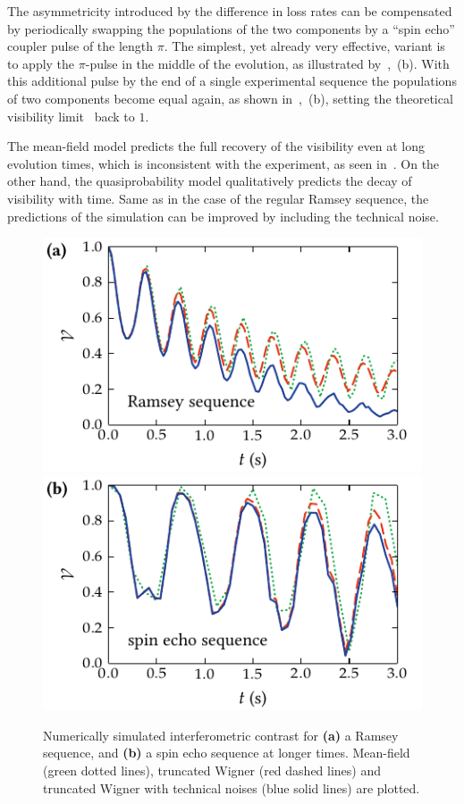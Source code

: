 The asymmetricity introduced by the difference in loss rates can be compensated by periodically swapping the populations of the two components by a ``spin echo'' coupler pulse of the length $\pi$.
The simplest, yet already very effective, variant is to apply the $\pi$-pulse in the middle of the evolution, as illustrated by~,~(b).
With this additional pulse by the end of a single experimental sequence the populations of two components become equal again, as shown in~,~(b), setting the theoretical visibility limit~ back to $1$.

The mean-field model predicts the full recovery of the visibility even at long evolution times, which is inconsistent with the experiment, as seen in~.
On the other hand, the quasiprobability model qualitatively predicts the decay of visibility with time.
Same as in the case of the regular Ramsey sequence, the predictions of the simulation can be improved by including the technical noise.

\begin{figure}
    \centerline{%
    \includegraphics{figures_generated/bec_noise/ramsey_visibility_long.pdf}%
    \includegraphics{figures_generated/bec_noise/echo_visibility_long.pdf}}

    \caption{Numerically simulated interferometric contrast for \textbf{(a)} a Ramsey sequence, and \textbf{(b)} a spin echo sequence at longer times.
    Mean-field (green dotted lines), truncated Wigner (red dashed lines) and truncated Wigner with technical noises (blue solid lines) are plotted.}%

    \label{fig:bec-noise:visibility:visibility-long}
\end{figure}

